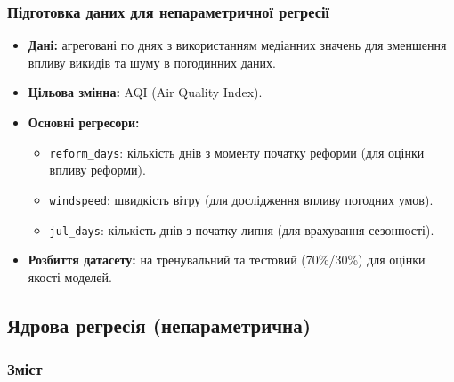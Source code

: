 \documentclass{beamer}
\begin{document}
\begin{frame}
  \frametitle{Підготовка даних для непараметричної регресії}
  \begin{itemize}
    \item \textbf{Дані:} агреговані по днях з використанням медіанних значень для зменшення впливу викидів та шуму в погодинних даних.
    \item \textbf{Цільова змінна:} AQI (Air Quality Index).
    \item \textbf{Основні регресори:}
        \begin{itemize}
            \item \texttt{reform\_days}: кількість днів з моменту початку реформи (для оцінки впливу реформи).
            \item \texttt{windspeed}: швидкість вітру (для дослідження впливу погодних умов).
            \item \texttt{jul\_days}: кількість днів з початку липня (для врахування сезонності).
        \end{itemize}
    \item \textbf{Розбиття датасету:} на тренувальний та тестовий (70\%/30\%) для оцінки якості моделей.
  \end{itemize}
\end{frame}

\begin{frame}
  \section{Ядрова регресія (непараметрична)}

  \frametitle{Зміст}
  \tableofcontents[currentsection]
\end{frame}
\end{document}
